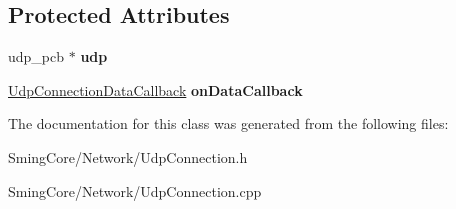 \subsection*{Protected Attributes}
\begin{DoxyCompactItemize}
\item 
\hypertarget{class_udp_connection_aacbf877beadcb472cf52a29670ba514e}{}udp\+\_\+pcb $\ast$ {\bfseries udp}\label{class_udp_connection_aacbf877beadcb472cf52a29670ba514e}

\item 
\hypertarget{class_udp_connection_ad66cc390ade1c60674d29751ad3b605e}{}\hyperlink{class_delegate}{Udp\+Connection\+Data\+Callback} {\bfseries on\+Data\+Callback}\label{class_udp_connection_ad66cc390ade1c60674d29751ad3b605e}

\end{DoxyCompactItemize}


The documentation for this class was generated from the following files\+:\begin{DoxyCompactItemize}
\item 
Sming\+Core/\+Network/Udp\+Connection.\+h\item 
Sming\+Core/\+Network/Udp\+Connection.\+cpp\end{DoxyCompactItemize}
